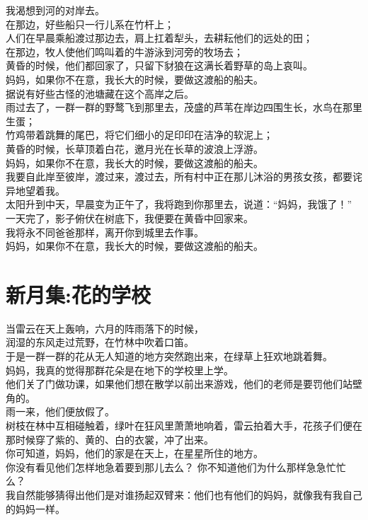 \documentclass[]{book}
\renewenvironment{quote}{\begin{VF}}{\end{VF}}
\begin{document}
\begin{quote}
我渴想到河的对岸去。\\
在那边，好些船只一行儿系在竹杆上；\\
人们在早晨乘船渡过那边去，肩上扛着犁头，去耕耘他们的远处的田；\\
在那边，牧人使他们鸣叫着的牛游泳到河旁的牧场去；\\
黄昏的时候，他们都回家了，只留下豺狼在这满长着野草的岛上哀叫。\\
妈妈，如果你不在意，我长大的时候，要做这渡船的船夫。\\
据说有好些古怪的池塘藏在这个高岸之后。\\
雨过去了，一群一群的野鹜飞到那里去，茂盛的芦苇在岸边四围生长，水鸟在那里生蛋；\\
竹鸡带着跳舞的尾巴，将它们细小的足印印在洁净的软泥上；\\
黄昏的时候，长草顶着白花，邀月光在长草的波浪上浮游。\\
妈妈，如果你不在意，我长大的时候，要做这渡船的船夫。\\
我要自此岸至彼岸，渡过来，渡过去，所有村中正在那儿沐浴的男孩女孩，都要诧异地望着我。\\
太阳升到中天，早晨变为正午了，我将跑到你那里去，说道：``妈妈，我饿了！''\\
一天完了，影子俯伏在树底下，我便要在黄昏中回家来。\\
我将永不同爸爸那样，离开你到城里去作事。\\
妈妈，如果你不在意，我长大的时候，要做这渡船的船夫。
\end{quote}

\section{新月集:花的学校}

\begin{quote}
当雷云在天上轰响，六月的阵雨落下的时候，\\
润湿的东风走过荒野，在竹林中吹着口笛。\\
于是一群一群的花从无人知道的地方突然跑出来，在绿草上狂欢地跳着舞。\\
妈妈，我真的觉得那群花朵是在地下的学校里上学。\\
他们关了门做功课，如果他们想在散学以前出来游戏，他们的老师是要罚他们站壁角的。\\
雨一来，他们便放假了。\\
树枝在林中互相碰触着，绿叶在狂风里萧萧地响着，雷云拍着大手，花孩子们便在那时候穿了紫的、黄的、白的衣裳，冲了出来。\\
你可知道，妈妈，他们的家是在天上，在星星所住的地方。\\
你没有看见他们怎样地急着要到那儿去么？
你不知道他们为什么那样急急忙忙么？\\
我自然能够猜得出他们是对谁扬起双臂来：他们也有他们的妈妈，就像我有我自己的妈妈一样。
\end{quote}
\end{document}
